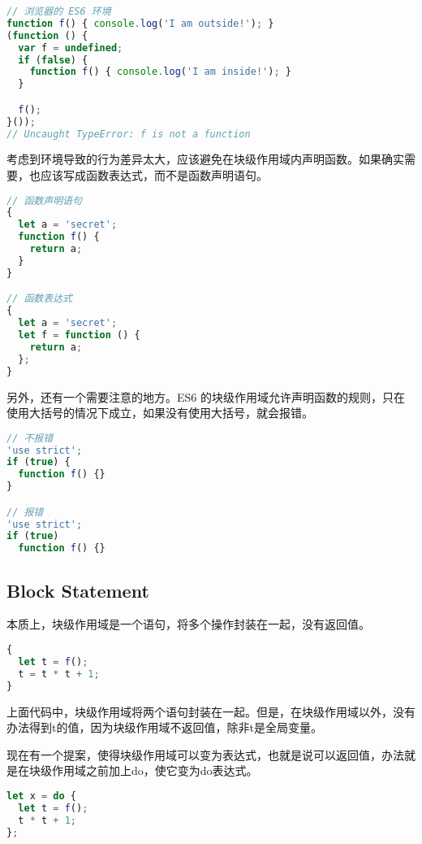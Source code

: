\begin{lstlisting}[language=JavaScript]
// 浏览器的 ES6 环境
function f() { console.log('I am outside!'); }
(function () {
  var f = undefined;
  if (false) {
    function f() { console.log('I am inside!'); }
  }

  f();
}());
// Uncaught TypeError: f is not a function
\end{lstlisting}

考虑到环境导致的行为差异太大，应该避免在块级作用域内声明函数。如果确实需要，也应该写成函数表达式，而不是函数声明语句。


\begin{lstlisting}[language=JavaScript]
// 函数声明语句
{
  let a = 'secret';
  function f() {
    return a;
  }
}

// 函数表达式
{
  let a = 'secret';
  let f = function () {
    return a;
  };
}
\end{lstlisting}


另外，还有一个需要注意的地方。ES6 的块级作用域允许声明函数的规则，只在使用大括号的情况下成立，如果没有使用大括号，就会报错。



\begin{lstlisting}[language=JavaScript]
// 不报错
'use strict';
if (true) {
  function f() {}
}

// 报错
'use strict';
if (true)
  function f() {}
\end{lstlisting}

\subsection{Block Statement}

本质上，块级作用域是一个语句，将多个操作封装在一起，没有返回值。



\begin{lstlisting}[language=JavaScript]
{
  let t = f();
  t = t * t + 1;
}
\end{lstlisting}

上面代码中，块级作用域将两个语句封装在一起。但是，在块级作用域以外，没有办法得到t的值，因为块级作用域不返回值，除非t是全局变量。

现在有一个提案，使得块级作用域可以变为表达式，也就是说可以返回值，办法就是在块级作用域之前加上do，使它变为do表达式。

\begin{lstlisting}[language=JavaScript]
let x = do {
  let t = f();
  t * t + 1;
};
\end{lstlisting}

